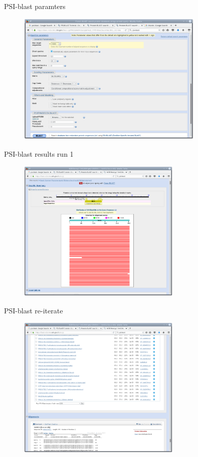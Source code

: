 \documentclass[pdf]{beamer}
\begin{document}
\begin{frame}{PSI-blast paramters}
  \begin{figure}[ht]
    \includegraphics[width=0.8\textwidth]{images/ncbi_psi_blast_2.png}
  \end{figure}
\end{frame}

\begin{frame}{PSI-blast results run 1}
  \begin{figure}[ht]
    \includegraphics[width=0.7\textwidth]{images/ncbi_psi_blast_3.png}
  \end{figure}
\end{frame}

\begin{frame}{PSI-blast re-iterate}
  \begin{figure}[ht]
    \includegraphics[width=0.7\textwidth]{images/ncbi_psi_blast_4.png}
  \end{figure}
\end{frame}
\end{document}
